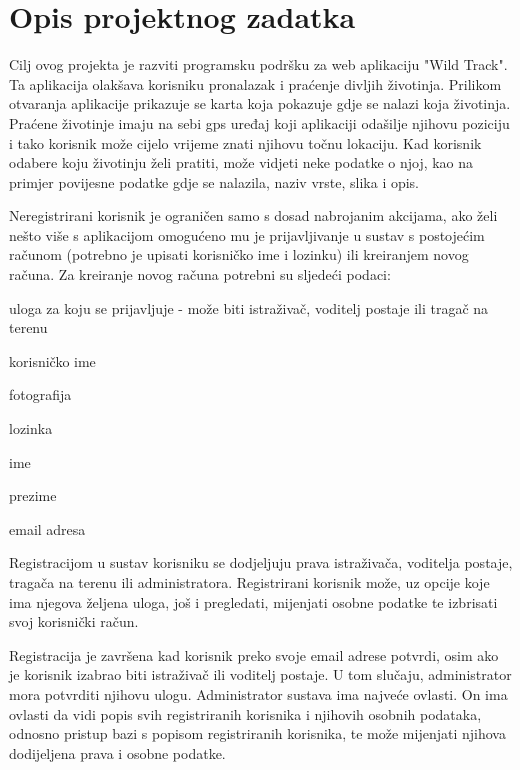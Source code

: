 \chapter{Opis projektnog zadatka}
		
	Cilj ovog projekta je razviti programsku podršku za web aplikaciju "Wild Track".
	Ta aplikacija olakšava korisniku pronalazak i praćenje divljih životinja.
	Prilikom otvaranja aplikacije prikazuje se karta koja pokazuje gdje se nalazi koja životinja.
	Praćene životinje imaju na sebi gps uređaj koji aplikaciji odašilje njihovu poziciju i tako korisnik može cijelo vrijeme znati njihovu točnu lokaciju.
	Kad korisnik odabere koju životinju želi pratiti, može vidjeti neke podatke o njoj, kao na primjer povijesne podatke gdje se nalazila, naziv vrste, slika i opis.
	
	Neregistrirani korisnik je ograničen samo s dosad nabrojanim akcijama, ako želi nešto više s aplikacijom omogućeno mu je prijavljivanje u sustav s postojećim računom 
	(potrebno je upisati korisničko ime i lozinku) ili kreiranjem novog računa. Za kreiranje novog računa potrebni su sljedeći podaci: 
	\begin{packed_item}
		\item uloga za koju se prijavljuje - može biti istraživač, voditelj postaje ili tragač na terenu
		\item korisničko ime 
		\item fotografija
		\item lozinka
		\item ime
		\item prezime
		\item email adresa
	\end{packed_item}

	Registracijom u sustav korisniku se dodjeljuju prava istraživača, voditelja postaje, tragača na terenu ili administratora.
	Registrirani korisnik može, uz opcije koje ima njegova željena uloga, još i pregledati, mijenjati osobne podatke te izbrisati svoj korisnički račun.

	Registracija je završena kad korisnik preko svoje email adrese potvrdi, osim ako je korisnik izabrao biti istraživač ili voditelj postaje. 
	U tom slučaju, administrator mora potvrditi njihovu ulogu. 
	Administrator sustava ima najveće ovlasti. 
	On ima ovlasti da vidi popis svih registriranih korisnika i njihovih osobnih podataka, odnosno pristup bazi s popisom registriranih korisnika, te može mijenjati njihova dodijeljena prava i osobne podatke.
	
